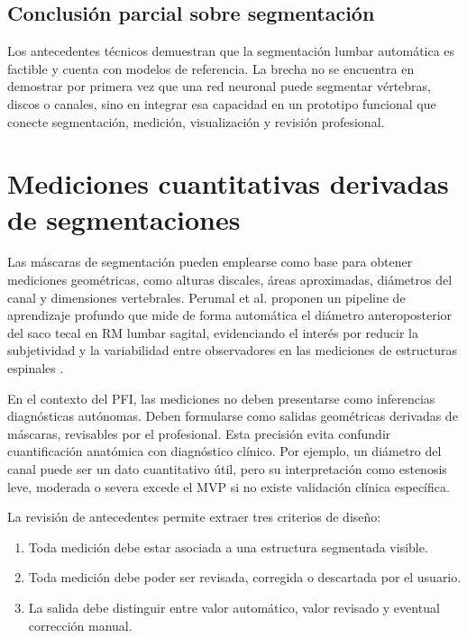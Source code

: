 \subsection{Conclusión parcial sobre segmentación}

Los antecedentes técnicos demuestran que la segmentación lumbar automática es factible y cuenta con modelos de referencia. La brecha no se encuentra en demostrar por primera vez que una red neuronal puede segmentar vértebras, discos o canales, sino en integrar esa capacidad en un prototipo funcional que conecte segmentación, medición, visualización y revisión profesional.

\section{Mediciones cuantitativas derivadas de segmentaciones}

Las máscaras de segmentación pueden emplearse como base para obtener mediciones geométricas, como alturas discales, áreas aproximadas, diámetros del canal y dimensiones vertebrales. Perumal et al. proponen un pipeline de aprendizaje profundo que mide de forma automática el diámetro anteroposterior del saco tecal en RM lumbar sagital, evidenciando el interés por reducir la subjetividad y la variabilidad entre observadores en las mediciones de estructuras espinales \parencite{perumal_thecal_sac_2026}.

En el contexto del PFI, las mediciones no deben presentarse como inferencias diagnósticas autónomas. Deben formularse como salidas geométricas derivadas de máscaras, revisables por el profesional. Esta precisión evita confundir cuantificación anatómica con diagnóstico clínico. Por ejemplo, un diámetro del canal puede ser un dato cuantitativo útil, pero su interpretación como estenosis leve, moderada o severa excede el MVP si no existe validación clínica específica.

La revisión de antecedentes permite extraer tres criterios de diseño:

\begin{enumerate}
    \item Toda medición debe estar asociada a una estructura segmentada visible.
    \item Toda medición debe poder ser revisada, corregida o descartada por el usuario.
    \item La salida debe distinguir entre valor automático, valor revisado y eventual corrección manual.
\end{enumerate}

